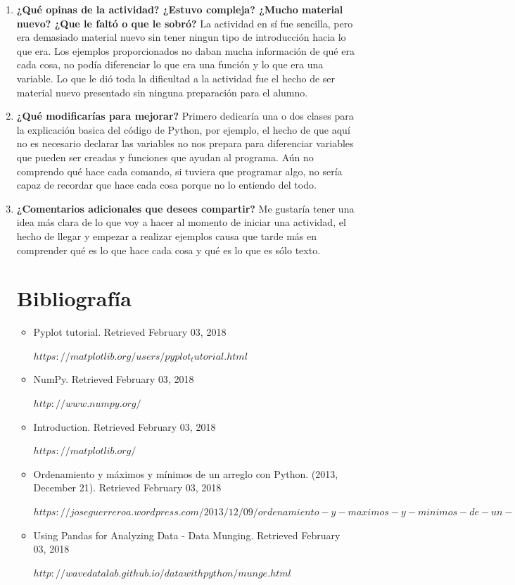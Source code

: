 \documentclass{article}
\begin{document}
\begin{enumerate}
\item \textbf{¿Qué opinas de la actividad? ¿Estuvo compleja? ¿Mucho material nuevo? ¿Que le faltó o que le sobró?}
La actividad en sí fue sencilla, pero era demasiado material nuevo sin tener ningun tipo de introducción hacia lo que era. Los ejemplos proporcionados no daban mucha información de qué era cada cosa, no podía diferenciar lo que era una función y lo que era una variable. Lo que le dió toda la dificultad a la actividad fue el hecho de ser material nuevo presentado sin ninguna preparación para el alumno.

\item \textbf{¿Qué modificarías para mejorar?}
Primero dedicaría una o dos clases para la explicación basica del código de Python, por ejemplo, el hecho de que aquí no es necesario declarar las variables no nos prepara para diferenciar variables que pueden ser creadas y funciones que ayudan al programa. Aún no comprendo qué hace cada comando, si tuviera que programar algo, no sería capaz de recordar que hace cada cosa porque no lo entiendo del todo.

\item \textbf{¿Comentarios adicionales que desees compartir?}
Me gustaría tener una idea más clara de lo que voy a hacer al momento de iniciar una actividad, el hecho de llegar y empezar a realizar ejemplos causa que tarde más en comprender qué es lo que hace cada cosa y qué es lo que es sólo texto.

\section{Bibliografía}
\begin{itemize}
\item Pyplot tutorial. Retrieved February 03, 2018

$https://matplotlib.org/users/pyplot_tutorial.html$

\item NumPy. Retrieved February 03, 2018

$http://www.numpy.org/$

\item Introduction. Retrieved February 03, 2018

$https://matplotlib.org/$

\item Ordenamiento y máximos y mínimos de un arreglo con Python. (2013, December 21). Retrieved February 03, 2018

$https://joseguerreroa.wordpress.com/2013/12/09/ordenamiento-y-maximos-y-minimos-de-un-arreglo-con-python/$

\item Using Pandas for Analyzing Data - Data Munging. Retrieved February 03, 2018

$http://wavedatalab.github.io/datawithpython/munge.html$
\end{itemize}
\end{enumerate}
\end{document}
